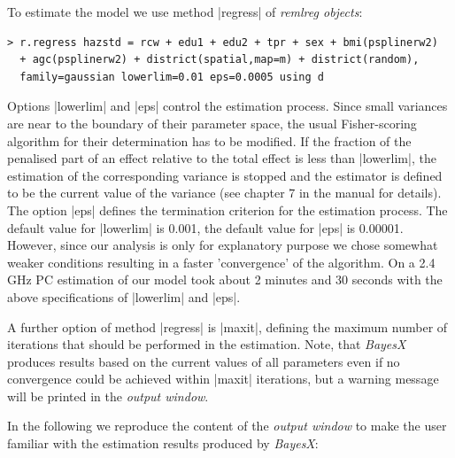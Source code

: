 \documentclass[a4paper]{article}
\begin{document}
To estimate the model we use method |regress| of {\em remlreg
objects}:
\begin{verbatim}
> r.regress hazstd = rcw + edu1 + edu2 + tpr + sex + bmi(psplinerw2)
  + agc(psplinerw2) + district(spatial,map=m) + district(random),
  family=gaussian lowerlim=0.01 eps=0.0005 using d
\end{verbatim}

Options |lowerlim| and |eps| control the estimation process. Since
small variances are near to the boundary of their parameter space,
the usual Fisher-scoring algorithm for their determination has to
be modified. If the fraction of the penalised part of an effect
relative to the total effect is less than |lowerlim|, the
estimation of the corresponding variance is stopped and the
estimator is defined to be the current value of the variance (see
chapter 7 in the manual for details). The option |eps| defines the
termination criterion for the estimation process. The default
value for |lowerlim| is 0.001, the default value for |eps| is
0.00001. However, since our analysis is only for explanatory
purpose we chose somewhat weaker conditions resulting in a faster
'convergence' of the algorithm. On a 2.4 GHz PC estimation of our
model took about 2 minutes and 30 seconds with the above
specifications of |lowerlim| and |eps|.

A further option of method |regress| is |maxit|, defining the
maximum number of iterations that should be performed in the
estimation. Note, that {\it BayesX} produces results based on the
current values of all parameters even if no convergence could be
achieved within |maxit| iterations, but a warning message will be
printed in the {\it output window}.

In the following we reproduce the content of the {\em output
window} to make the user familiar with the estimation results
produced by {\em BayesX}:
\end{document}
